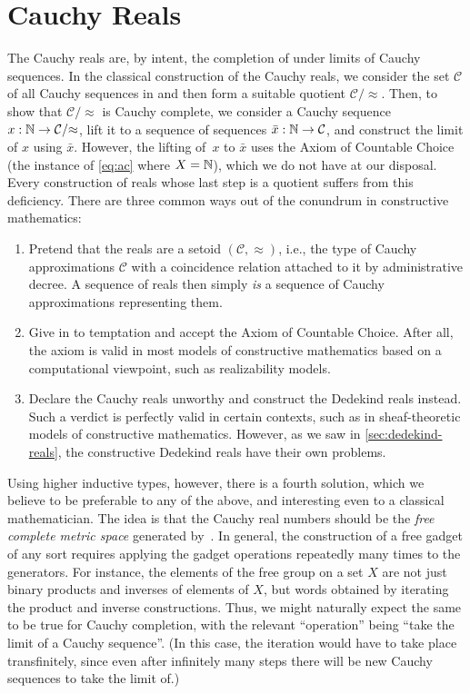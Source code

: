 \section{Cauchy Reals}
\label{sec:cauchy-reals}

The Cauchy reals are, by intent, the completion of \Q under limits of Cauchy sequences.
In the classical construction of the Cauchy reals, we consider the set $\mathcal{C}$ of all Cauchy sequences in \Q and then form a suitable quotient $\mathcal{C}/{\approx}$.
Then, to show that $\mathcal{C}/{\approx}$ is Cauchy complete, we consider a Cauchy sequence $x : \mathbb{N} \to \mathcal{C}/{\approx}$, lift it to a sequence of sequences $\bar{x} : \mathbb{N} \to \mathcal{C}$, and construct the limit of $x$ using $\bar{x}$. However, the lifting of~$x$ to $\bar{x}$ uses
the Axiom of Countable Choice (the instance of \autoref{eq:ac} where $X=\mathbb{N}$), which we do not have at our disposal.
Every construction of reals whose last step is a quotient suffers from this deficiency.
There are three common ways out of the conundrum in constructive mathematics:
%
\begin{enumerate}
\item Pretend that the reals are a setoid $(\mathcal{C}, {\approx})$, i.e., the type of
  Cauchy approximations $\mathcal{C}$ with a coincidence relation attached to it by
  administrative decree. A sequence of reals then simply \emph{is} a sequence of Cauchy
  approximations representing them.
\item Give in to temptation and accept the Axiom of Countable Choice. After all, the axiom
  is valid in most models of constructive mathematics based on a computational viewpoint,
  such as realizability models.
\item Declare the Cauchy reals unworthy and construct the Dedekind reals instead.
  Such a verdict is perfectly valid in certain contexts, such as in sheaf-theoretic models of constructive mathematics.
  However, as we saw in \autoref{sec:dedekind-reals}, the constructive Dedekind reals have their own problems.
\end{enumerate}

Using higher inductive types, however, there is a fourth solution, which we believe to be preferable to any of the above, and interesting even to a classical mathematician.
The idea is that the Cauchy real numbers should be the \emph{free complete metric space} generated by~\Q.
In general, the construction of a free gadget of any sort requires applying the gadget operations repeatedly many times to the generators.
For instance, the elements of the free group on a set $X$ are not just binary products and inverses of elements of $X$, but words obtained by iterating the product and inverse constructions.
Thus, we might naturally expect the same to be true for Cauchy completion, with the relevant ``operation'' being ``take the limit of a Cauchy sequence''.
(In this case, the iteration would have to take place transfinitely, since even after infinitely many steps there will be new Cauchy sequences to take the limit of.)


